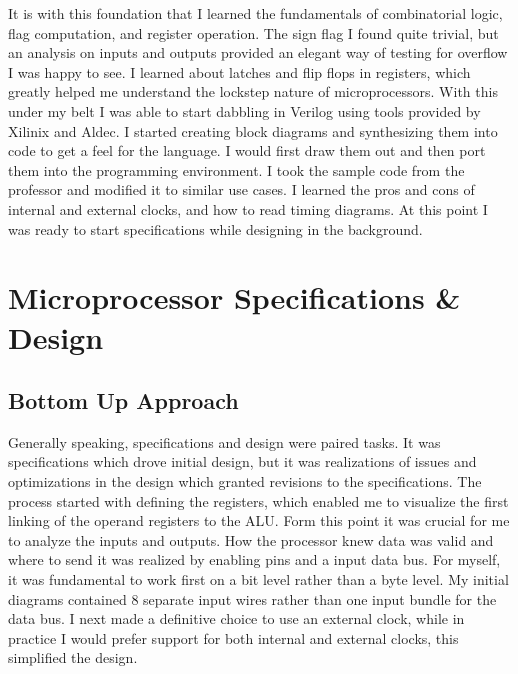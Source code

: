 \documentclass{article}
\begin{document}
It is with this foundation that I learned the fundamentals of combinatorial logic, flag computation, and register operation. 
The sign flag I found quite trivial, but an analysis on inputs and outputs provided an elegant way of testing for overflow I was happy to see. 
I learned about latches and flip flops in registers, which greatly helped me understand the lockstep nature of microprocessors. 
With this under my belt I was able to start dabbling in Verilog using tools provided by Xilinix and Aldec. 
I started creating block diagrams and synthesizing them into code to get a feel for the language. 
I would first draw them out and then port them into the programming environment. 
I took the sample code from the professor and modified it to similar use cases. 
I learned the pros and cons of internal and external clocks, and how to read timing diagrams. 
At this point I was ready to start specifications while designing in the background. 

\section{Microprocessor Specifications \& Design}
\subsection{Bottom Up Approach}
Generally speaking, specifications and design were paired tasks. 
It was specifications which drove initial design, but it was realizations of issues and optimizations in the design which granted revisions to the specifications. 
The process started with defining the registers, which enabled me to visualize the first linking of the operand registers to the ALU. 
Form this point it was crucial for me to analyze the inputs and outputs. 
How the processor knew data was valid and where to send it was realized by enabling pins and a input data bus. 
For myself, it was fundamental to work first on a bit level rather than a byte level. 
My initial diagrams contained 8 separate input wires rather than one input bundle for the data bus. 
I next made a definitive choice to use an external clock, while in practice I would prefer support for both internal and external clocks, this simplified the design. 
\end{document}

